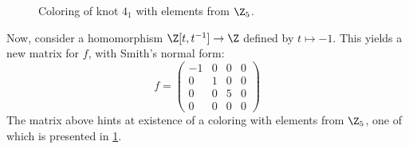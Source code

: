 \begin{example}
\begin{figure}[h]
    \caption{\label{fig:4_1:coloring} Coloring of knot $4_1$ with elements from $\Z_5$.}
  \end{figure}

  Now, consider a homomorphism $\Z[t, t^{-1}]\to \Z$ defined by $t\mapsto -1$. This yields a new matrix for $f$, with Smith's normal form:
  $$f=\begin{pmatrix}
    -1 & 0 & 0 & 0\\
    0 & 1 & 0 & 0\\
    0 & 0 & 5 & 0\\
    0 & 0 & 0 & 0
  \end{pmatrix}$$
  The matrix above hints at existence of a coloring with elements from $\Z_5$, one of which is presented in \cref{fig:4_1:coloring}.
\end{example}
